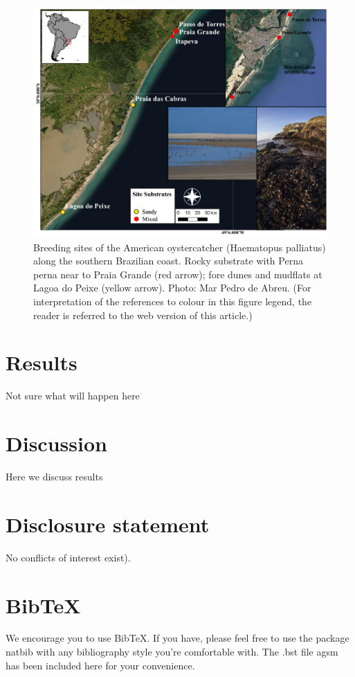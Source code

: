 \documentclass[
  12pt]{article}
\begin{document}
\begin{figure}

{\centering \includegraphics[width=5in,height=\textheight]{fig1.png}

}

\caption{\label{fig-first}Breeding sites of the American oystercatcher
(Haematopus palliatus) along the southern Brazilian coast. Rocky
substrate with Perna perna near to Praia Grande (red arrow); fore dunes
and mudflats at Lagoa do Peixe (yellow arrow). Photo: Mar Pedro de
Abreu. (For interpretation of the references to colour in this figure
legend, the reader is referred to the web version of this article.)}

\end{figure}

\hypertarget{sec-verify}{%
\section{Results}\label{sec-verify}}

Not sure what will happen here

\hypertarget{sec-conc}{%
\section{Discussion}\label{sec-conc}}

Here we discuss results

\hypertarget{disclosure-statement}{%
\section{Disclosure statement}\label{disclosure-statement}}

No conflicts of interest exist).

\hypertarget{bibtex}{%
\section{BibTeX}\label{bibtex}}

We encourage you to use BibTeX. If you have, please feel free to use the
package natbib with any bibliography style you're comfortable with. The
.bst file agsm has been included here for your convenience.


  
\end{document}
